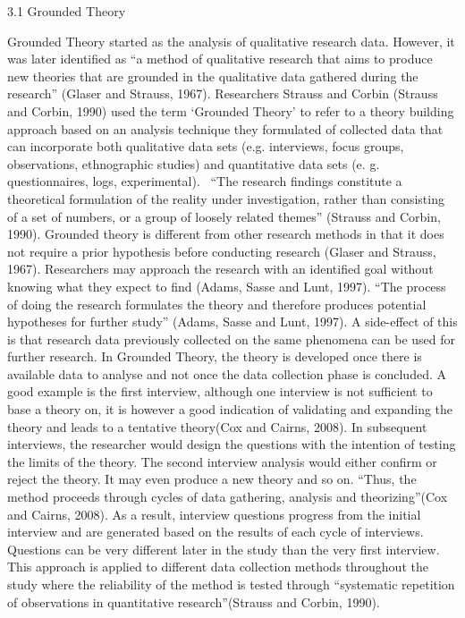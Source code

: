 3.1 Grounded Theory 

Grounded Theory started as the analysis of qualitative research data. However, it was later identified as “a method of qualitative research that aims to produce new theories that are grounded in the qualitative data gathered during the research” (Glaser and Strauss, 1967).
Researchers Strauss and Corbin (Strauss and Corbin, 1990) used the term ‘Grounded Theory’ to refer to a theory building approach based on an analysis technique they formulated of collected data that can incorporate both qualitative data sets (e.g. interviews, focus groups, observations, ethnographic studies) and quantitative data sets (e. g. questionnaires, logs, experimental).  “The research ﬁndings constitute a theoretical formulation of the reality under investigation, rather than consisting of a set of numbers, or a group of loosely related themes” (Strauss and Corbin, 1990).
Grounded theory is different from other research methods in that it does not require a prior hypothesis before conducting research (Glaser and Strauss, 1967).  Researchers may approach the research with an identified goal without knowing what they expect to find (Adams, Sasse and Lunt, 1997). “The process of doing the research formulates the theory and therefore produces potential hypotheses for further study” (Adams, Sasse and Lunt, 1997). A side-effect of this is that research data previously collected on the same phenomena can be used for further research.
In Grounded Theory, the theory is developed once there is available data to analyse and not once the data collection phase is concluded. A good example is the first interview, although one interview is not sufficient to base a theory on, it is however a good indication of validating and expanding the theory and leads to a tentative theory(Cox and Cairns, 2008).
In subsequent interviews, the researcher would design the questions with the intention of testing the limits of the theory.  The second interview analysis would either confirm or reject the theory.  It may even produce a new theory and so on. “Thus, the method proceeds through cycles of data gathering, analysis and theorizing”(Cox and Cairns, 2008).  As a result, interview questions progress from the initial interview and are generated based on the results of each cycle of interviews.  Questions can be very different later in the study than the very first interview.  This approach is applied to different data collection methods throughout the study where the reliability of the method is tested through “systematic repetition of observations in quantitative research”(Strauss and Corbin, 1990).
